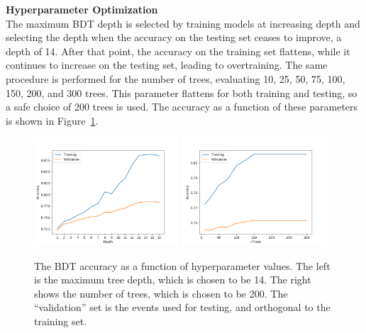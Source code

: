 \noindent\textbf{Hyperparameter Optimization}\\
\indent The maximum \gls{BDT} depth is selected by training models at increasing depth and selecting the depth when the accuracy on the testing set ceases to improve, a depth of 14. After that point, the accuracy on the training set flattens, while it continues to increase on the testing set, leading to overtraining. The same procedure is performed for the number of trees, evaluating 10, 25, 50, 75, 100, 150, 200, and 300 trees. This parameter flattens for both training and testing, so a safe choice of 200 trees is used. The accuracy as a function of these parameters is shown in Figure~\ref{fig:hp-opt}.


\begin{figure}[!h]
  \centering
  \includegraphics[width=0.48\textwidth]{chapters/chapter6_vbf/images/hp_opt/multiclass_optimized_depth.png}
  \includegraphics[width=0.48\textwidth]{chapters/chapter6_vbf/images/hp_opt/multiclass_optimized_trees.png}
  \caption[The \gls{BDT} accuracy as a function of hyperparameter values]{The \gls{BDT} accuracy as a function of hyperparameter values. The left is the maximum tree depth, which is chosen to be 14. The right shows the number of trees, which is chosen to be 200. The ``validation'' set is the events used for testing, and orthogonal to the training set.}
  \label{fig:hp-opt}
\end{figure}

